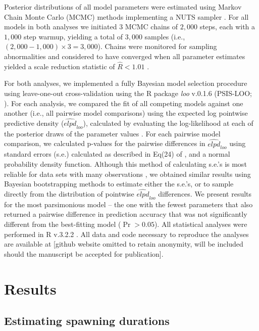 \documentclass{article}
\begin{document}
	Posterior distributions of all model parameters were estimated using Markov Chain Monte Carlo (MCMC) methods implementing a NUTS sampler \citep{Stan2016}. For all models in both analyses we initiated $3$ MCMC chains of $2,000$ steps, each with a $1,000$ step warmup, yielding a total of $3,000$ samples (i.e., $(2,000 - 1,000) \times 3 = 3,000$). Chains were monitored for sampling abnormalities and considered to have converged when all parameter estimates yielded a scale reduction statistic of $\hat{R} < 1.01$ \citep{GelmanRubin1992}.

	For both analyses, we implemented a fully Bayesian model selection procedure using leave-one-out cross-validation using the R package \textit{loo} v.0.1.6 (PSIS-LOO; \citealt{Vehtari2016}). For each analysis, we compared the fit of all competing models against one another (i.e., all pairwise model comparisons) using the expected log pointwise predictive density ($\widehat{\textit{elpd}}_{\textit{loo}}$), calculated by evaluating the log-likelihood at each of the posterior draws of the parameter values \citep{HootenHobbs2015,Vehtari2016}. For each pairwise model comparison, we calculated p-values for the pairwise differences in $\widehat{\textit{elpd}}_{\textit{loo}}$ using standard errors (s.e.) calculated as described in Eq(24) of \citet{Vehtari2016}, and a normal probability density function. Although this method of calculating s.e.'s is most reliable for data sets with many observations \citep{Vehtari2016}, we obtained similar results using Bayesian bootstrapping methods to estimate either the s.e.'s, or to sample directly from the distribution of pointwise $\widehat{\textit{elpd}}_{\textit{loo}}$ differences. We present results for the most parsimonious model -- the one with the fewest parameters that also returned a pairwise difference in prediction accuracy that was not significantly different from the best-fitting model ($\Pr > 0.05$). All statistical analyses were performed in R v.3.2.2 \citep{R2016}. All data and code necessary to reproduce the analyses are available at [github website omitted to retain anonymity, will be included should the manuscript be accepted for publication]. 

\section{Results}

	\subsection*{Estimating spawning durations}
\end{document}
